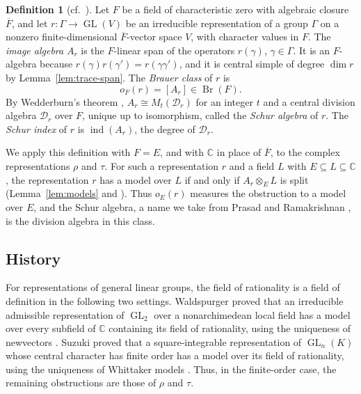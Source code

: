 \documentclass[a4paper,11pt]{amsart}
\theoremstyle{definition}
\newtheorem{definition}[theorem]{Definition}
\theoremstyle{remark}
\numberwithin{equation}{section}
\DeclareMathOperator{\Br}{Br}
\DeclareMathOperator{\GL}{GL}
\DeclareMathOperator{\ind}{ind}
\newcommand{\C}{\mathbb{C}}
\begin{document}
\begin{definition}[cf.~{\cite[Definition~3.0.6]{Su23}}]\label{def:brauer-class}
Let $F$ be a field of characteristic zero with algebraic closure $\overline F$, and let $r\colon\Gamma\to\GL(V)$ be an irreducible representation of a group $\Gamma$ on a nonzero finite-dimensional $\overline F$-vector space $V$, with character values in $F$. The \emph{image algebra} $A_r$ is the $F$-linear span of the operators $r(\gamma)$, $\gamma\in\Gamma$. It is an $F$-algebra because $r(\gamma)r(\gamma')=r(\gamma\gamma')$, and it is central simple of degree $\dim r$ by Lemma~\ref{lem:trace-span}. The \emph{Brauer class} of $r$ is
\[
 o_F(r)=[A_r]\in\Br(F).
\]
By Wedderburn's theorem \cite[IV, Theorem~1.17 and Corollary~1.22]{Mil20}, $A_r\cong M_t(\mathcal D_r)$ for an integer $t$ and a central division algebra $\mathcal D_r$ over $F$, unique up to isomorphism, called the \emph{Schur algebra} of $r$. The \emph{Schur index} of $r$ is $\ind(A_r)$, the degree of $\mathcal D_r$.
\end{definition}

We apply this definition with $F=E$, and with $\C$ in place of $\overline F$, to the complex representations $\rho$ and $\tau$. For such a representation $r$ and a field $L$ with $E\subseteq L\subseteq\C$, the representation $r$ has a model over $L$ if and only if $A_r\otimes_EL$ is split (Lemma~\ref{lem:models} and \cite[Lemma~3.0.7]{Su23}). Thus $o_E(r)$ measures the obstruction to a model over $E$, and the Schur algebra, a name we take from Prasad and Ramakrishnan \cite[\S6]{PR12}, is the division algebra in this class.

\subsection{History}\label{subsec:intro-history}

For representations of general linear groups, the field of rationality is a field of definition in the following two settings. Waldspurger proved that an irreducible admissible representation of $\GL_2$ over a nonarchimedean local field has a model over every subfield of $\C$ containing its field of rationality, using the uniqueness of newvectors \cite[Lemma~I.2.1]{Wal85}. Suzuki proved that a square-integrable representation of $\GL_n(K)$ whose central character has finite order has a model over its field of rationality, using the uniqueness of Whittaker models \cite[Lemma~4.0.4]{Su23}. Thus, in the finite-order case, the remaining obstructions are those of $\rho$ and $\tau$.
\end{document}
